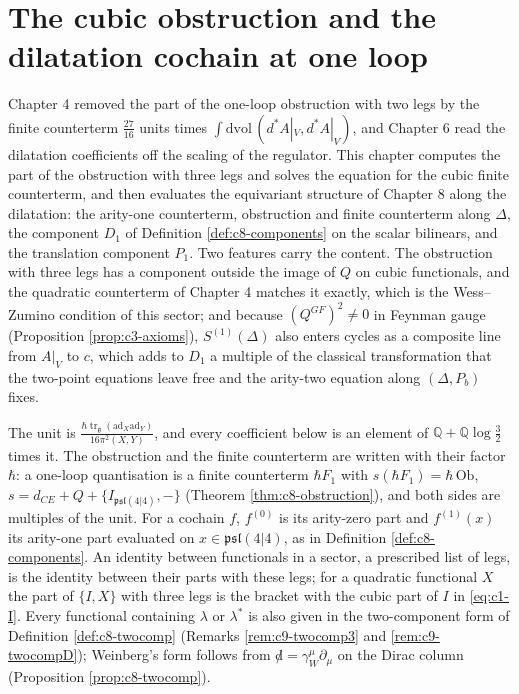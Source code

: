 \chapter{The cubic obstruction and the dilatation cochain at one loop}

Chapter 4 removed the part of the one-loop obstruction with two legs by the finite counterterm $\tfrac{27}{16}$ units times $\int\mathrm{dvol}\,(d^*A|_V,d^*A|_V)$, and Chapter 6 read the dilatation coefficients off the scaling of the regulator. This chapter computes the part of the obstruction with three legs and solves the equation for the cubic finite counterterm, and then evaluates the equivariant structure of Chapter 8 along the dilatation: the arity-one counterterm, obstruction and finite counterterm along $\Delta$, the component $D_1$ of Definition \ref{def:c8-components} on the scalar bilinears, and the translation component $P_1$. Two features carry the content. The obstruction with three legs has a component outside the image of $Q$ on cubic functionals, and the quadratic counterterm of Chapter 4 matches it exactly, which is the Wess--Zumino condition of this sector; and because $(Q^{GF})^2\neq0$ in Feynman gauge (Proposition \ref{prop:c3-axioms}), $S^{(1)}(\Delta)$ also enters cycles as a composite line from $A|_V$ to $c$, which adds to $D_1$ a multiple of the classical transformation that the two-point equations leave free and the arity-two equation along $(\Delta,P_b)$ fixes.

The unit is $\frac{\hbar\operatorname{tr}_{\mathfrak g}(\mathrm{ad}_X\mathrm{ad}_Y)}{16\pi^2(X,Y)}$, and every coefficient below is an element of $\mathbb Q+\mathbb Q\log\tfrac32$ times it. The obstruction and the finite counterterm are written with their factor $\hbar$: a one-loop quantisation is a finite counterterm $\hbar F_1$ with $s(\hbar F_1)=\hbar\,\mathrm{Ob}$, $s=d_{CE}+Q+\{I_{\mathfrak{psl}(4|4)},-\}$ (Theorem \ref{thm:c8-obstruction}), and both sides are multiples of the unit. For a cochain $f$, $f^{(0)}$ is its arity-zero part and $f^{(1)}(x)$ its arity-one part evaluated on $x\in\mathfrak{psl}(4|4)$, as in Definition \ref{def:c8-components}. An identity between functionals in a sector, a prescribed list of legs, is the identity between their parts with these legs; for a quadratic functional $X$ the part of $\{I,X\}$ with three legs is the bracket with the cubic part of $I$ in \eqref{eq:c1-I}. Every functional containing $\lambda$ or $\lambda^*$ is also given in the two-component form of Definition \ref{def:c8-twocomp} (Remarks \ref{rem:c9-twocomp3} and \ref{rem:c9-twocompD}); Weinberg's form follows from ${\not d}=\gamma_W^\mu\partial_\mu$ on the Dirac column (Proposition \ref{prop:c8-twocomp}).

